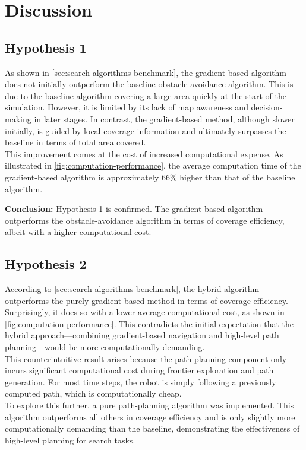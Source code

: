 \section{Discussion}
\subsection{Hypothesis 1}
As shown in \cref{sec:search-algorithms-benchmark}, the gradient-based algorithm does not initially outperform the baseline obstacle-avoidance algorithm. This is due to the baseline algorithm covering a large area quickly at the start of the simulation. However, it is limited by its lack of map awareness and decision-making in later stages. In contrast, the gradient-based method, although slower initially, is guided by local coverage information and ultimately surpasses the baseline in terms of total area covered.\\

This improvement comes at the cost of increased computational expense. As illustrated in \cref{fig:computation-performance}, the average computation time of the gradient-based algorithm is approximately 66\% higher than that of the baseline algorithm.\

\textbf{Conclusion:} Hypothesis 1 is confirmed. The gradient-based algorithm outperforms the obstacle-avoidance algorithm in terms of coverage efficiency, albeit with a higher computational cost.

\subsection{Hypothesis 2}
According to \cref{sec:search-algorithms-benchmark}, the hybrid algorithm outperforms the purely gradient-based method in terms of coverage efficiency. Surprisingly, it does so with a lower average computational cost, as shown in \cref{fig:computation-performance}. This contradicts the initial expectation that the hybrid approach—combining gradient-based navigation and high-level path planning—would be more computationally demanding.\\

This counterintuitive result arises because the path planning component only incurs significant computational cost during frontier exploration and path generation. For most time steps, the robot is simply following a previously computed path, which is computationally cheap.\\

To explore this further, a pure path-planning algorithm was implemented. This algorithm outperforms all others in coverage efficiency and is only slightly more computationally demanding than the baseline, demonstrating the effectiveness of high-level planning for search tasks.\\


